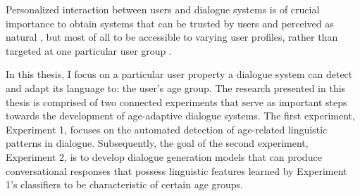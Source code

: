 Personalized interaction between users and dialogue systems is of crucial importance to obtain systems that can be trusted by users and perceived as natural \citep{van2019exploring}, but most of all to be accessible to varying user profiles, rather than targeted at one particular user group \citep{zheng2019personalized, zeng-etal-2020-meddialog}.

In this thesis, I focus on a particular user property a dialogue system can detect and adapt its language to: the user's age group. 
The research presented in this thesis is comprised of two connected experiments that serve as important steps towards the development of age-adaptive dialogue systems.
The first experiment, Experiment 1, focuses on the automated detection of age-related linguistic patterns in dialogue. 
Subsequently, the goal of the second experiment, Experiment 2, is to develop dialogue generation models that can produce conversational responses that possess linguistic features learned by Experiment 1's classifiers to be characteristic of certain age groups.

